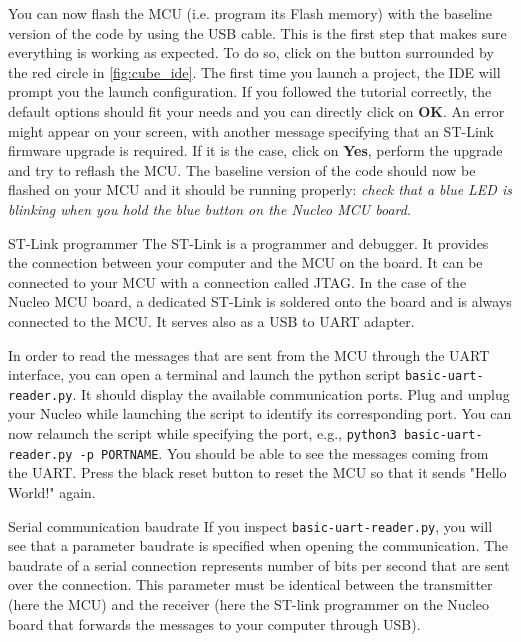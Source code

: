 You can now flash the MCU (i.e. program its Flash memory) with the baseline version of the code by using the USB cable. This is the first step that makes sure everything is working as expected. To do so, click on the button surrounded by the red circle in \autoref{fig:cube_ide}. The first time you launch a project, the IDE will prompt you the launch configuration. If you followed the tutorial correctly, the default options should fit your needs and you can directly click on \textbf{OK}. An error might appear on your screen, with another message specifying that an ST-Link firmware upgrade is required. If it is the case, click on \textbf{Yes}, perform the upgrade and try to reflash the MCU. The baseline version of the code should now be flashed on your MCU and it should be running properly: \textit{check that a blue LED is blinking when you hold the blue button on the Nucleo MCU board}.

\begin{bclogo}[couleur = gray!20, arrondi = 0.2, logo=\bcinfo]{ST-Link programmer}
The ST-Link is a programmer and debugger. It provides the connection between your computer and the MCU on the board. It can be connected to your MCU with a connection called JTAG. In the case of the Nucleo MCU board, a dedicated ST-Link is soldered onto the board and is always connected to the MCU. It serves also as a USB to UART adapter.
\end{bclogo}

In order to read the messages that are sent from the MCU through the UART interface, you can open a terminal and launch the python script \texttt{basic-uart-reader.py}. It should display the available communication ports.
Plug and unplug your Nucleo while launching the script to identify its corresponding port. You can now relaunch the script while specifying the port, e.g., \texttt{python3 basic-uart-reader.py -p PORTNAME}.
You should be able to see the messages coming from the UART. Press the black reset button to reset the MCU so that it sends "Hello World!" again.

\begin{bclogo}[couleur = gray!20, arrondi = 0.2, logo=\bcinfo]{Serial communication baudrate }
If you inspect \texttt{basic-uart-reader.py}, you will see that a parameter baudrate is specified when opening the communication. The baudrate of a serial connection represents number of bits per second that are sent over the connection. This parameter must be identical between the transmitter (here the MCU) and the receiver (here the ST-link programmer on the Nucleo board that forwards the messages to your computer through USB). \end{bclogo}

